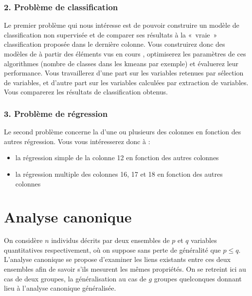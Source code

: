 \documentclass[letterpaper,10pt,french]{sphinxmanual}
\begin{document}
\subsection{2. Problème de classification}
\label{\detokenize{TP/TP_etudiant:probleme-de-classification}}
\sphinxAtStartPar
Le premier problème qui nous intéresse est de pouvoir construire un modèle de classification non supervisée et de comparer ses résultats à la « vraie » classification proposée dans le dernière colonne.
Vous construirez donc des modèles de  à partir des éléments vus en cours , optimiserez les paramètres de ces algorithmes (nombre de classes dans les k\sphinxhyphen{}means par exemple) et évaluerez leur performance.
Vous travaillerez d’une part sur les variables retenues par sélection de variables, et d’autre part sur les variables calculées par extraction de variables. Vous comparerez les résultats de classification obtenus.


\subsection{3. Problème de régression}
\label{\detokenize{TP/TP_etudiant:probleme-de-regression}}
\sphinxAtStartPar
Le second problème concerne la  d’une ou plusieurs des colonnes en fonction des autres régression. Vous vous intéresserez donc à :
\begin{itemize}
\item {} 
\sphinxAtStartPar
la régression simple de la colonne 12 en fonction des autres colonnes

\item {} 
\sphinxAtStartPar
la régression multiple des colonnes 16, 17 et 18 en fonction des autres colonnes

\end{itemize}

\sphinxstepscope


\chapter{Analyse canonique}
\label{\detokenize{canonique:analyse-canonique}}\label{\detokenize{canonique::doc}}
\sphinxAtStartPar
On considère \(n\) individus décrits par deux ensembles de \(p\) et \(q\) variables quantitatives respectivement, où on suppose sans perte de généralité que \(p\leq q\). L’analyse canonique se propose d’examiner les liens existants entre ces deux ensembles afin de savoir s’ils mesurent les mêmes propriétés. On se retreint ici au cas de deux groupes, la généralisation au cas de \(g\) groupes quelconques donnant lieu à l’analyse canonique généralisée.
\end{document}
